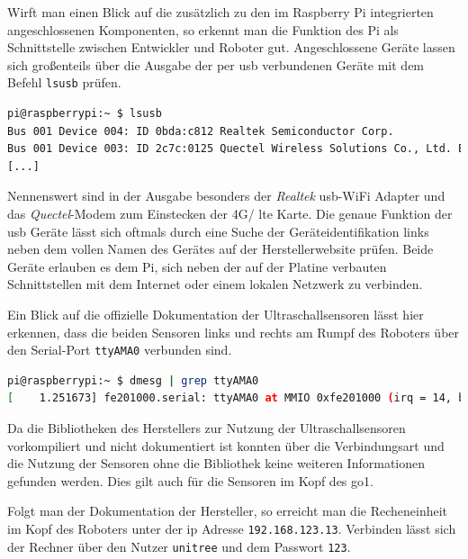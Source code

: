 Wirft man einen Blick auf die zusätzlich zu den im Raspberry Pi integrierten angeschlossenen Komponenten, so erkennt
man die Funktion des Pi als Schnittstelle zwischen Entwickler und Roboter gut.
Angeschlossene Geräte lassen sich großenteils über die Ausgabe der per \gls{usb} verbundenen Geräte mit dem Befehl
\texttt{lsusb} prüfen.

\begin{lstlisting}[language=sh, label=lst:pi-usb]
pi@raspberrypi:~ $ lsusb
Bus 001 Device 004: ID 0bda:c812 Realtek Semiconductor Corp.
Bus 001 Device 003: ID 2c7c:0125 Quectel Wireless Solutions Co., Ltd. EC25 LTE modem
[...]
\end{lstlisting}

\noindent Nennenswert sind in der Ausgabe besonders der \emph{Realtek} \gls{usb}-WiFi Adapter und das \emph{Quectel}-Modem zum
Einstecken der 4G/ \gls{lte} Karte.
Die genaue Funktion der \gls{usb} Geräte lässt sich oftmals durch eine Suche der Geräteidentifikation links neben dem
vollen Namen des Gerätes auf der Herstellerwebsite prüfen.
Beide Geräte erlauben es dem Pi, sich neben der auf der Platine verbauten Schnittstellen mit dem Internet oder einem lokalen
Netzwerk zu verbinden.

Ein Blick auf die offizielle Dokumentation der Ultraschallsensoren lässt hier erkennen, dass die beiden Sensoren links und rechts
am Rumpf des Roboters über den Serial-Port \texttt{ttyAMA0} verbunden sind.

\begin{lstlisting}[language=sh, label=lst:pi-ultrasonic]
pi@raspberrypi:~ $ dmesg | grep ttyAMA0
[    1.251673] fe201000.serial: ttyAMA0 at MMIO 0xfe201000 (irq = 14, base_baud = 0) is a PL011 rev2
\end{lstlisting}

\noindent Da die Bibliotheken des Herstellers zur Nutzung der Ultraschallsensoren vorkompiliert und nicht dokumentiert ist
konnten über die Verbindungsart und die Nutzung der Sensoren ohne die Bibliothek keine weiteren Informationen gefunden werden.
Dies gilt auch für die Sensoren im Kopf des \gls{go1}.

\label{par:nano-kopf}

Folgt man der Dokumentation der Hersteller, so erreicht man die Recheneinheit im Kopf des Roboters unter der \gls{ip} Adresse \texttt{192.168.123.13}.
Verbinden lässt sich der Rechner über den Nutzer \texttt{unitree} und dem Passwort \texttt{123}.

